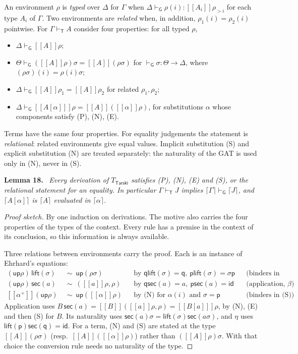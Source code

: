 \documentclass[11pt]{article}
\newenvironment{lemma}[1]{\par\medskip\noindent\textbf{Lemma #1.}\ \itshape}{\par\medskip}
\theoremstyle{definition}
\theoremstyle{remark}
\newcommand{\vdashG}{\vdash_{\mathsf G}}
\newcommand{\vdashT}{\vdash_{\mathsf T}}
\newcommand{\p}{\mathsf p}
\newcommand{\q}{\mathsf q}
\newcommand{\id}{\mathsf{id}}
\newcommand{\lift}{\mathsf{lift}}
\newcommand{\sect}{\mathsf{sec}}
\newcommand{\ev}[2]{[\![#1]\!]#2}
\newcommand{\up}{\mathsf{up}}
\begin{document}
An environment $\rho$ is \emph{typed} over $\Delta$ for $\Gamma$ when
$\Delta\vdashG\rho(i):\ev{A_i}\rho_{>i}$ for each type $A_i$ of $\Gamma$.
Two environments are \emph{related} when, in addition, $\rho_1(i)=\rho_2(i)$
pointwise. For $\Gamma\vdashT A$ consider four properties: for all typed $\rho$,
\begin{itemize}
\item[(P)] $\Delta\vdashG\ev A\rho$;
\item[(N)] $\Theta\vdashG(\ev A\rho)\sigma=\ev A{(\rho\sigma)}$ for
  $\vdashG\sigma:\Theta\to\Delta$, where $(\rho\sigma)(i)=\rho(i)\sigma$;
\item[(E)] $\Delta\vdashG\ev A{\rho_1}=\ev A{\rho_2}$ for related $\rho_1,\rho_2$;
\item[(S)] $\Delta\vdashG\ev{A[\alpha]}\rho=\ev A{(\ev\alpha\rho)}$, for
  substitutions $\alpha$ whose components satisfy (P), (N), (E).
\end{itemize}
Terms have the same four properties. For equality judgements the statement is
\emph{relational}: related environments give equal values. Implicit
substitution (S) and explicit substitution (N) are treated separately: the
naturality of the GAT is used only in (N), never in (S).

\begin{lemma}{18}
Every derivation of $T_{\mathsf{Tarski}}$ satisfies (P), (N), (E) and (S),
or the relational statement for an equality.
In particular $\Gamma\vdashT J$ implies $\lceil\Gamma\rceil\vdashG\lceil J\rceil$,
and $\lceil A[\alpha]\rceil$ is $\lceil A\rceil$ evaluated in $\lceil\alpha\rceil$.
\end{lemma}

\begin{proof}[Proof sketch]
By one induction on derivations. The motive also carries the four properties
of the types of the context. Every rule has a premise in the context of its
conclusion, so this information is always available.

Three relations between environments carry the proof. Each is an instance
of Ehrhard's equations:
\begin{align*}
(\up\rho)\,\lift(\sigma)&\ \sim\ \up(\rho\sigma) &&\text{by } \q\lift(\sigma)=\q,\ \p\lift(\sigma)=\sigma\p
 &&\text{(binders in (N))}\\
(\up\rho)\,\sect(a)&\ \sim\ (\ev a\rho,\rho) &&\text{by } \q\sect(a)=a,\ \p\sect(a)=\id
 &&\text{(application, $\beta$)}\\
\ev{\alpha^+}{(\up\rho)}&\ \sim\ \up(\ev\alpha\rho) &&\text{by (N) for } \alpha(i) \text{ and } \sigma=\p
 &&\text{(binders in (S))}
\end{align*}
Application uses $B\,\sect(a)=\ev B{(\ev a\rho,\rho)}=\ev{B[a]}\rho$, by (N),
(E) and then (S) for $B$. Its naturality uses
$\sect(a)\sigma=\lift(\sigma)\sect(a\sigma)$, and $\eta$ uses
$\lift(\p)\sect(\q)=\id$. For a term, (N) and (S) are stated at the type
$\ev A{(\rho\sigma)}$ (resp.\ $\ev A{(\ev\alpha\rho)}$) rather than
$(\ev A\rho)\sigma$. With that choice the conversion rule needs no naturality
of the type.
\end{proof}
\end{document}
